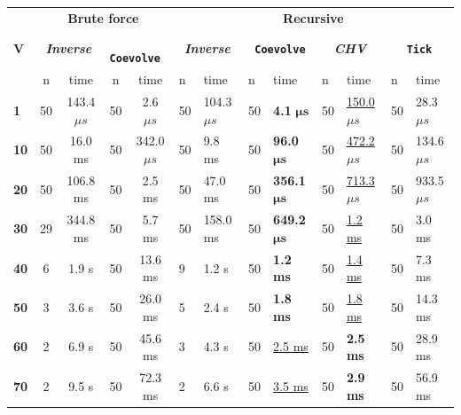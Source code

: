 \documentclass{juliacon}
\begin{document}
\begin{table}
\centering
\begin{tabular}{lccccllllllll} 
\toprule
 & \multicolumn{4}{c}{\textbf{ Brute force }} & \multicolumn{8}{c}{\textbf{Recursive}} \\
\textbf{ V } & \multicolumn{2}{c}{\textbf{ \textit{Inverse} }} & \multicolumn{2}{c}{\textbf{\texttt{ Coevolve }}} & \multicolumn{2}{c}{\textbf{ \textit{Inverse} }} & \multicolumn{2}{c}{\textbf{\texttt{ Coevolve }}} & \multicolumn{2}{c}{\textbf{\textit{ CHV }}} & \multicolumn{2}{c}{\textbf{ \texttt{Tick} }} \\
            & n  & time              & n  & time              & n  & time              & n  & time                            & n  & time                          & n             & time              \\
\textbf{1}  & 50 & 143.4 \( \mu s \) & 50 & 2.6 \( \mu s \)   & 50 & 104.3 \( \mu s \) & 50 & \textbf{4.1} \( \bm{\mu s} \)   & 50 & \underline{150.0 \( \mu s \)} & 50            & 28.3 \( \mu s \)  \\
\textbf{10} & 50 & 16.0 ms           & 50 & 342.0 \( \mu s \) & 50 & 9.8 ms            & 50 & \textbf{96.0} \( \bm{\mu s} \)  & 50 & \underline{472.2 \( \mu s \)} & 50            & 134.6 \( \mu s \) \\
\textbf{20} & 50 & 106.8 ms          & 50 & 2.5 ms            & 50 & 47.0 ms           & 50 & \textbf{356.1} \( \bm{\mu s} \) & 50 & \underline{713.3 \( \mu s \)} & 50            & 933.5 \( \mu s \) \\
\textbf{30} & 29 & 344.8 ms          & 50 & 5.7 ms            & 50 & 158.0 ms          & 50 & \textbf{649.2} \( \bm{\mu s} \) & 50 & \underline{1.2 ms}            & 50            & 3.0 ms            \\
\textbf{40} & 6  & 1.9 s             & 50 & 13.6 ms           & 9  & 1.2 s             & 50 & \textbf{1.2 ms}                 & 50 & \underline{1.4 ms}            & 50            & 7.3 ms            \\
\textbf{50} & 3  & 3.6 s             & 50 & 26.0 ms           & 5  & 2.4 s             & 50 & \textbf{1.8 ms}                 & 50 & \underline{1.8 ms}            & 50            & 14.3 ms           \\
\textbf{60} & 2  & 6.9 s             & 50 & 45.6 ms           & 3  & 4.3 s             & 50 & \underline{2.5 ms}              & 50 & \textbf{2.5  ms}              & 50            & 28.9 ms           \\
\textbf{70} & 2  & 9.5 s             & 50 & 72.3 ms           & 2  & 6.6 s             & 50 & \underline{3.5 ms}              & 50 & \textbf{2.9 ms}               & 50            & 56.9 ms           \\

\end{tabular}
\end{table}
\end{document}
